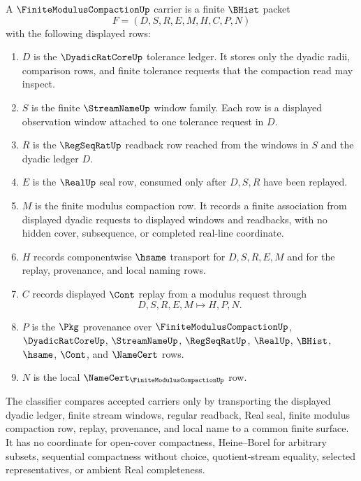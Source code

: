 \begin{definition}\label{def:finite-modulus-compaction-carrier}
A $\FiniteModulusCompactionUp$ carrier is a finite $\BHist$ packet
$$
F=(D,S,R,E,M,H,C,P,N)
$$
with the following displayed rows:
\begin{enumerate}
\item $D$ is the $\DyadicRatCoreUp$ tolerance ledger. It stores only the dyadic radii, comparison rows, and finite tolerance requests that the compaction read may inspect.
\item $S$ is the finite $\StreamNameUp$ window family. Each row is a displayed observation window attached to one tolerance request in $D$.
\item $R$ is the $\RegSeqRatUp$ readback row reached from the windows in $S$ and the dyadic ledger $D$.
\item $E$ is the $\RealUp$ seal row, consumed only after $D,S,R$ have been replayed.
\item $M$ is the finite modulus compaction row. It records a finite association from displayed dyadic requests to displayed windows and readbacks, with no hidden cover, subsequence, or completed real-line coordinate.
\item $H$ records componentwise $\hsame$ transport for $D,S,R,E,M$ and for the replay, provenance, and local naming rows.
\item $C$ records displayed $\Cont$ replay from a modulus request through
$$
D,S,R,E,M \longmapsto H,P,N .
$$
\item $P$ is the $\Pkg$ provenance over $\FiniteModulusCompactionUp$, $\DyadicRatCoreUp$, $\StreamNameUp$, $\RegSeqRatUp$, $\RealUp$, $\BHist$, $\hsame$, $\Cont$, and $\NameCert$ rows.
\item $N$ is the local $\NameCert_{\FiniteModulusCompactionUp}$ row.
\end{enumerate}
The classifier compares accepted carriers only by transporting the displayed dyadic ledger, finite stream windows, regular readback, Real seal, finite modulus compaction row, replay, provenance, and local name to a common finite surface. It has no coordinate for open-cover compactness, Heine--Borel for arbitrary subsets, sequential compactness without choice, quotient-stream equality, selected representatives, or ambient Real completeness.
\end{definition}

